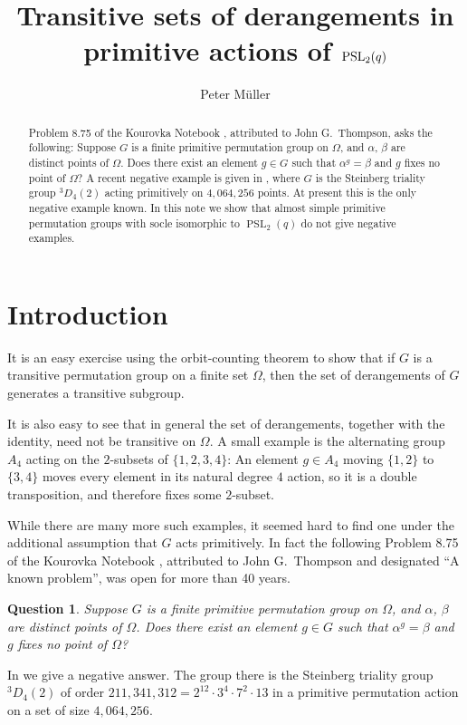 \documentclass[12pt]{amsart}
\title{Transitive sets of derangements in primitive actions of $\PSL_2(q)$}
\author{Peter M\"uller}
\theoremstyle{plain}
\newtheorem{question}[theorem]{Question}
\theoremstyle{definition}
\numberwithin{equation}{section}
\newcommand*{\set}[1]{\{#1\}}
\DeclareMathOperator{\PSL}{PSL}
\begin{document}
\begin{abstract}
  Problem 8.75 of the Kourovka Notebook \cite{kourovka_notebook},
  attributed to John G.~Thompson, asks the following: Suppose $G$ is a
  finite primitive permutation group on $\Omega$, and $\alpha$,
  $\beta$ are distinct points of $\Omega$. Does there exist an element
  $g\in G$ such that $\alpha^g=\beta$ and $g$ fixes no point of
  $\Omega$? A recent negative example is given in
  \cite{mueller___8.75}, where $G$ is the Steinberg triality group
  ${}^{3}D_{4}(2)$ acting primitively on $4{,}064{,}256$ points. At
  present this is the only negative example known. In this note we
  show that almost simple primitive permutation groups with socle
  isomorphic to $\PSL_2(q)$ do not give negative examples.
\end{abstract}
\maketitle
\section{Introduction}
It is an easy exercise using the orbit-counting theorem to show that
if $G$ is a transitive permutation group on a finite set $\Omega$,
then the set of derangements of $G$ generates a transitive subgroup.

It is also easy to see that in general the set of derangements,
together with the identity, need not be transitive on $\Omega$. A
small example is the alternating group $A_4$ acting on the $2$-subsets
of $\set{1,2,3,4}$: An element $g\in A_4$ moving $\set{1,2}$ to
$\set{3,4}$ moves every element in its natural degree $4$ action, so
it is a double transposition, and therefore fixes some $2$-subset.

While there are many more such examples, it seemed hard to find one
under the additional assumption that $G$ acts primitively. In fact the
following Problem 8.75 of the Kourovka Notebook
\cite{kourovka_notebook}, attributed to John G.~Thompson and
designated ``A known problem'', was open for more than 40 years.
\begin{question}\label{q:8.75}
  Suppose $G$ is a finite primitive permutation group on $\Omega$, and
  $\alpha$, $\beta$ are distinct points of $\Omega$. Does there exist
  an element $g\in G$ such that $\alpha^g=\beta$ and $g$ fixes no
  point of $\Omega$?
\end{question}
In \cite{mueller___8.75} we give a negative answer. The group there is
the Steinberg triality group ${}^{3}D_{4}(2)$ of order
$211{,}341{,}312 = 2^{12}\cdot 3^{4}\cdot 7^{2}\cdot 13$ in a
primitive permutation action on a set of size $4{,}064{,}256$.
\end{document}
